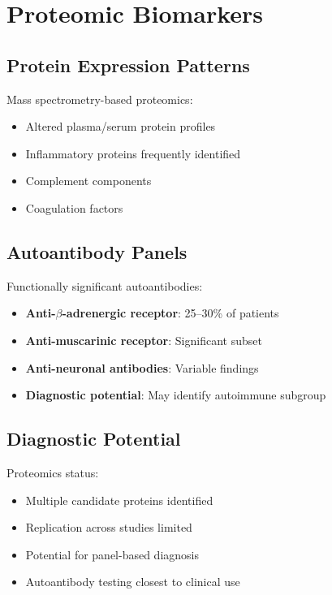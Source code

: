 \section{Proteomic Biomarkers}
\label{sec:proteomic}

\subsection{Protein Expression Patterns}

Mass spectrometry-based proteomics:
\begin{itemize}
    \item Altered plasma/serum protein profiles
    \item Inflammatory proteins frequently identified
    \item Complement components
    \item Coagulation factors
\end{itemize}

\subsection{Autoantibody Panels}

Functionally significant autoantibodies:
\begin{itemize}
    \item \textbf{Anti-$\beta$-adrenergic receptor}: 25--30\% of patients
    \item \textbf{Anti-muscarinic receptor}: Significant subset
    \item \textbf{Anti-neuronal antibodies}: Variable findings
    \item \textbf{Diagnostic potential}: May identify autoimmune subgroup
\end{itemize}

\subsection{Diagnostic Potential}

Proteomics status:
\begin{itemize}
    \item Multiple candidate proteins identified
    \item Replication across studies limited
    \item Potential for panel-based diagnosis
    \item Autoantibody testing closest to clinical use
\end{itemize}


